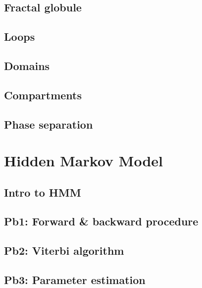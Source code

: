 \documentclass[]{book}
\begin{document}
\hypertarget{fractal-globule}{%
\section{Fractal globule}\label{fractal-globule}}

\hypertarget{loops}{%
\section{Loops}\label{loops}}

\hypertarget{domains}{%
\section{Domains}\label{domains}}

\hypertarget{compartments}{%
\section{Compartments}\label{compartments}}

\hypertarget{phase-separation}{%
\section{Phase separation}\label{phase-separation}}

\hypertarget{hmm}{%
\chapter{Hidden Markov Model}\label{hmm}}

\hypertarget{intro-to-hmm}{%
\section{Intro to HMM}\label{intro-to-hmm}}

\hypertarget{pb1-forward-backward-procedure}{%
\section{Pb1: Forward \& backward procedure}\label{pb1-forward-backward-procedure}}

\hypertarget{pb2-viterbi-algorithm}{%
\section{Pb2: Viterbi algorithm}\label{pb2-viterbi-algorithm}}

\hypertarget{pb3-parameter-estimation}{%
\section{Pb3: Parameter estimation}\label{pb3-parameter-estimation}}
\end{document}
